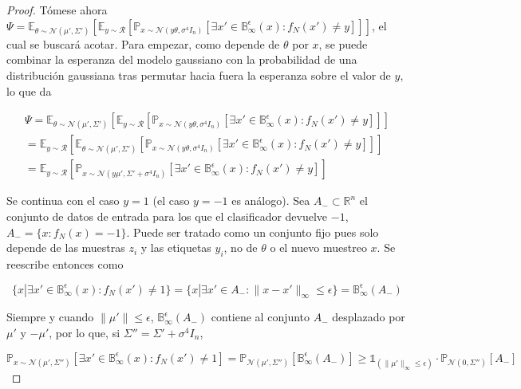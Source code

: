 \begin{proof}
Tómese ahora $\Psi = \mathbb{E}_{\theta \sim \mathcal{N}(\mu',\Sigma')} \left[ \mathbb{E}_{y \sim \mathcal{R}} \left[ \mathbb{P}_{x \sim \mathcal{N}(y \theta,\sigma^4 I_n)} [\exists x' \in \mathbb{B}_{\infty}^\epsilon (x) : f_N(x') \neq y] \right] \right]$, el cual se buscará acotar. Para empezar, como depende de $\theta$ por $x$, se puede combinar la esperanza del modelo gaussiano con la probabilidad de una distribución gaussiana tras permutar hacia fuera la esperanza sobre el valor de $y$, lo que da

\begin{multline}
\Psi = \mathbb{E}_{\theta \sim \mathcal{N}(\mu',\Sigma')} \left[ \mathbb{E}_{y \sim \mathcal{R}} \left[ \mathbb{P}_{x \sim \mathcal{N}(y \theta,\sigma^4 I_n)} [\exists x' \in \mathbb{B}_{\infty}^\epsilon (x):f_N(x') \neq y] \right] \right] \\
= \mathbb{E}_{y \sim \mathcal{R}} \left[ \mathbb{E}_{\theta \sim \mathcal{N}(\mu',\Sigma')} \left[ \mathbb{P}_{x \sim \mathcal{N}(y \theta, \sigma^4 I_n)} [\exists x' \in \mathbb{B}_{\infty}^\epsilon (x): f_N(x') \neq y] \right] \right] \\
= \mathbb{E}_{y \sim \mathcal{R}} \left[ \mathbb{P}_{x \sim \mathcal{N}(y \mu',\Sigma' + \sigma^4 I_n)} [\exists x' \in \mathbb{B}_{\infty}^\epsilon (x): f_N(x') \neq y] \right]
\end{multline} 

Se continua con el caso $y=1$ (el caso $y=-1$ es análogo). Sea $A_{-} \subset \mathbb{R}^n$ el conjunto de datos de entrada para los que el clasificador devuelve $-1$, $A_{-}=\{x:f_N(x) = -1\}$. Puede ser tratado como un conjunto fijo pues solo depende de las muestras $z_i$ y las etiquetas $y_i$, no de $\theta$ o el nuevo muestreo $x$.  Se reescribe entonces como

$$\{x| \exists x' \in \mathbb{B}_{\infty}^\epsilon(x) : f_N(x') \neq 1\} = \{x| \exists x' \in A_{-} : \|x-x' \|_{\infty} \leq \epsilon \} = \mathbb{B}_{\infty}^\epsilon (A_{-})$$

Siempre y cuando $\|\mu' \| \leq \epsilon$, $\mathbb{B}_{\infty}^\epsilon (A_{-})$ contiene al conjunto $A_{-}$ desplazado por $\mu'$ y $- \mu'$, por lo que, si $\Sigma''=\Sigma' + \sigma^4 I_n$,

$$\mathbb{P}_{x \sim \mathcal{N}(\mu',\Sigma'')} [\exists x' \in \mathbb{B}_{\infty}^\epsilon (x): f_N(x') \neq 1] = \mathbb{P}_{\mathcal{N}(\mu',\Sigma'')}[\mathbb{B}_{\infty}^\epsilon (A_{-})] \geq \mathbb{1}_{(\|\mu' \|_{\infty} \leq \epsilon)} \cdot \mathbb{P}_{\mathcal{N}(0,\Sigma'')} [A_{-}]$$



\end{proof}
